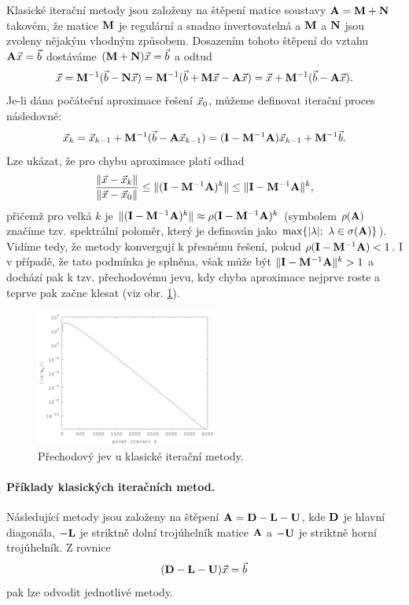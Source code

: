 Klasické iterační metody jsou založeny na štěpení matice soustavy $\mathbf{A} = \mathbf{M} + \mathbf{N}$ takovém, že matice $\mathbf{M}$ je regulární a snadno invertovatelná a $\mathbf{M}$ a $\mathbf{N}$ jsou zvoleny nějakým vhodným způsobem.
Dosazením tohoto štěpení do vztahu $\mathbf{A}\vec{x} = \vec{b}$ dostáváme $(\mathbf{M} + \mathbf{N})\vec{x} = \vec{b}$ a odtud
$$ \vec{x} = \mathbf{M}^{-1}(\vec{b} - \mathbf{N}\vec{x}) = \mathbf{M}^{-1}(\vec{b} + \mathbf{M}\vec{x} - \mathbf{A}\vec{x}) = \vec{x} + \mathbf{M}^{-1}(\vec{b} - \mathbf{A}\vec{x}). $$
Je-li dána počáteční aproximace řešení $\vec{x}_0$, můžeme definovat iterační proces následovně:
$$ \vec{x}_k = \vec{x}_{k-1} + \mathbf{M}^{-1} (\vec{b} - \mathbf{A}\vec{x}_{k-1} )
= (\mathbf{I} - \mathbf{M}^{-1}\mathbf{A})\vec{x}_{k-1} + \mathbf{M}^{-1}\vec{b}. $$
Lze ukázat, že pro chybu aproximace platí odhad
$$ \frac{\|\vec{x}-\vec{x}_k\|}{\|\vec{x}-\vec{x}_0\|} \le \|(\mathbf{I}-\mathbf{M}^{-1}\mathbf{A})^k\| \le \|\mathbf{I}-\mathbf{M}^{-1}\mathbf{A}\|^k, $$
přičemž pro velká $k$ je $\|(\mathbf{I}-\mathbf{M}^{-1}\mathbf{A})^k\|\approx\rho(\mathbf{I}-\mathbf{M}^{-1}\mathbf{A})^k$ (symbolem $\rho(\mathbf{A})$ značíme tzv. spektrální poloměr, který je definován jako $\max\{|\lambda|;~\lambda\in\sigma(\mathbf{A})\}$).
Vidíme tedy, že metody konvergují k přesnému řešení, pokud $\rho(\mathbf{I}-\mathbf{M}^{-1}\mathbf{A})<1$.
I v případě, že tato podmínka je splněna, však může být $\|\mathbf{I}-\mathbf{M}^{-1}\mathbf{A}\|^k>1$ a dochází pak k tzv. přechodovému jevu, kdy chyba aproximace nejprve roste a teprve pak začne klesat (viz obr. \ref{fig:prechod}).
\begin{figure}
\centering
\includegraphics[width=6cm]{img/prechod}
\caption{Přechodový jev u klasické iterační metody.}
\label{fig:prechod}
\end{figure}


\paragraph{Příklady klasických iteračních metod.}
Následující metody jsou založeny na štěpení $\mathbf{A}=\mathbf{D}-\mathbf{L}-\mathbf{U}$, kde $\mathbf{D}$ je hlavní diagonála, $-\mathbf{L}$ je striktně dolní trojúhelník matice $\mathbf{A}$ a $-\mathbf{U}$ je striktně horní trojúhelník.
Z rovnice
$$ (\mathbf{D}-\mathbf{L}-\mathbf{U})\vec{x}=\vec{b} $$
pak lze odvodit jednotlivé metody.

